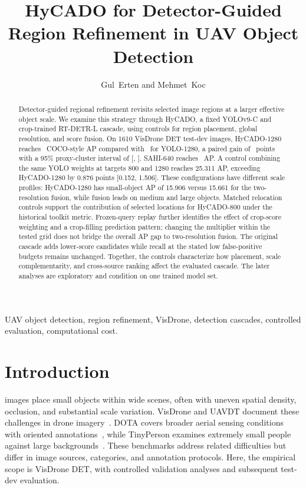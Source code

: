 \documentclass[journal]{IEEEtran}
\title{HyCADO for Detector-Guided Region Refinement in UAV Object Detection}
\author{Gul~Erten and Mehmet~Koc}
\begin{document}
\maketitle

\begin{abstract}
Detector-guided regional refinement revisits selected image regions at a larger effective object scale. We examine this strategy through HyCADO, a fixed YOLOv9-C and crop-trained RT-DETR-L cascade, using controls for region placement, global resolution, and score fusion. On 1610 VisDrone DET test-dev images, HyCADO-1280 reaches \CocoH\ COCO-style AP compared with \CocoY\ for YOLO-1280, a paired gain of \CocoHY\ points with a 95\% proxy-cluster interval of [\CocoHYLow, \CocoHYHigh]. SAHI-640 reaches \CocoS\ AP. A control combining the same YOLO weights at targets 800 and 1280 reaches 25.311 AP, exceeding HyCADO-1280 by 0.876 points [0.152, 1.506]. These configurations have different scale profiles: HyCADO-1280 has small-object AP of 15.906 versus 15.661 for the two-resolution fusion, while fusion leads on medium and large objects. Matched relocation controls support the contribution of selected locations for HyCADO-800 under the historical toolkit metric. Frozen-query replay further identifies the effect of crop-score weighting and a crop-filling prediction pattern; changing the multiplier within the tested grid does not bridge the overall AP gap to two-resolution fusion. The original cascade adds lower-score candidates while recall at the stated low false-positive budgets remains unchanged. Together, the controls characterize how placement, scale complementarity, and cross-source ranking affect the evaluated cascade. The later analyses are exploratory and condition on one trained model set.

\end{abstract}

\begin{IEEEkeywords}
UAV object detection, region refinement, VisDrone, detection cascades, controlled evaluation, computational cost.
\end{IEEEkeywords}

\section{Introduction}
 images place small objects within wide scenes, often with uneven spatial density, occlusion, and substantial scale variation. VisDrone and UAVDT document these challenges in drone imagery~\cite{du2019visdrone,du2018uavdt}. DOTA covers broader aerial sensing conditions with oriented annotations~\cite{xia2018dota}, while TinyPerson examines extremely small people against large backgrounds~\cite{yu2020tinyperson}. These benchmarks address related difficulties but differ in image sources, categories, and annotation protocols. Here, the empirical scope is VisDrone DET, with controlled validation analyses and subsequent test-dev evaluation.
\end{document}
